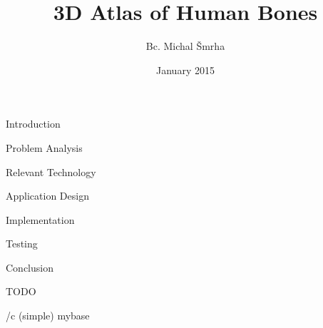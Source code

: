 

\worktype [M/EN]
\title {3D Atlas of Human Bones}
\author {Bc. Michal Šmrha}
\date {January 2015}
\makefront

\chap Introduction



\chap Problem Analysis



\chap Relevant Technology



\chap Application Design



\chap Implementation



\chap Testing



\chap Conclusion

TODO

\bibchap
\usebib/c (simple) mybase

\bye